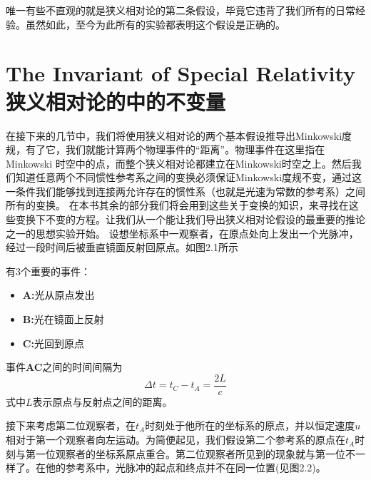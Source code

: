 唯一有些不直观的就是狭义相对论的第二条假设，毕竟它违背了我们所有的日常经验。虽然如此，至今为此所有的实验都表明这个假设是正确的。
\section[狭义相对论的中的不变量]{The Invariant of Special Relativity \quad 狭义相对论的中的不变量}
\label{sec2.1}
在接下来的几节中，我们将使用狭义相对论的两个基本假设推导出Minkowski度规，有了它，我们就能计算两个物理事件的“距离”。物理事件在这里指在Minkowski 时空中的点，而整个狭义相对论都建立在Minkowski时空之上。然后我们知道任意两个不同惯性参考系之间的变换必须保证Minkowski度规不变，通过这一条件我们能够找到连接两允许存在的惯性系（也就是光速为常数的参考系）之间所有的变换。
在本书其余的部分我们将会用到这些关于变换的知识，来寻找在这些变换下不变的方程。让我们从一个能让我们导出狭义相对论假设的最重要的推论之一的思想实验开始。
{}
设想坐标系中一观察者，在原点处向上发出一个光脉冲，经过一段时间后被垂直镜面反射回原点。如图2.1所示

有3个重要的事件：
\begin{itemize}
  \item {\bf{A:}}光从原点发出
  \item {\bf{B:}}光在镜面上反射
  \item {\bf{C:}}光回到原点
\end{itemize}
事件{\bf{AC}}之间的时间间隔为
\begin{equation}\label{equ2.1}
\Delta t=t_C-t_A=\frac{2L}{c}
\end{equation}
式中$L$表示原点与反射点之间的距离。

{}


接下来考虑第二位观察者，在$t_A$时刻处于他所在的坐标系的原点，并以恒定速度$u$相对于第一个观察者向左运动。为简便起见，我们假设第二个参考系的原点在$t_A$时刻与第一位观察者的坐标系原点重合。第二位观察者所见到的现象就与第一位不一样了。在他的参考系中，光脉冲的起点和终点并不在同一位置(见图2.2)。

